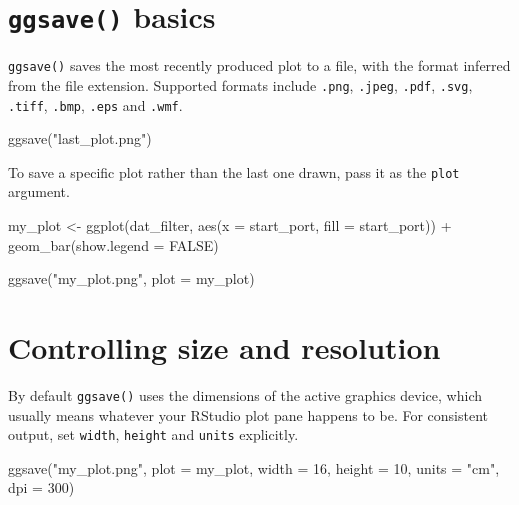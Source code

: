 \documentclass[
  english,
  letterpaper,
]{book}
\newenvironment{Shaded}{\begin{snugshade}}{\end{snugshade}}
\newcommand{\AttributeTok}[1]{\textcolor[rgb]{0.40,0.45,0.13}{#1}}
\newcommand{\ConstantTok}[1]{\textcolor[rgb]{0.56,0.35,0.01}{#1}}
\newcommand{\DecValTok}[1]{\textcolor[rgb]{0.68,0.00,0.00}{#1}}
\newcommand{\FunctionTok}[1]{\textcolor[rgb]{0.28,0.35,0.67}{#1}}
\newcommand{\NormalTok}[1]{\textcolor[rgb]{0.00,0.23,0.31}{#1}}
\newcommand{\OtherTok}[1]{\textcolor[rgb]{0.00,0.23,0.31}{#1}}
\newcommand{\SpecialCharTok}[1]{\textcolor[rgb]{0.37,0.37,0.37}{#1}}
\newcommand{\StringTok}[1]{\textcolor[rgb]{0.13,0.47,0.30}{#1}}
\begin{document}
\section{\texorpdfstring{\texttt{ggsave()}
basics}{ggsave() basics}}\label{ggsave-basics}

\texttt{ggsave()} saves the most recently produced plot to a file, with
the format inferred from the file extension. Supported formats include
\texttt{.png}, \texttt{.jpeg}, \texttt{.pdf}, \texttt{.svg},
\texttt{.tiff}, \texttt{.bmp}, \texttt{.eps} and \texttt{.wmf}.

\begin{Shaded}
\begin{Highlighting}[]
\FunctionTok{ggsave}\NormalTok{(}\StringTok{"last\_plot.png"}\NormalTok{)}
\end{Highlighting}
\end{Shaded}

To save a specific plot rather than the last one drawn, pass it as the
\texttt{plot} argument.

\begin{Shaded}
\begin{Highlighting}[]
\NormalTok{my\_plot }\OtherTok{\textless{}{-}} \FunctionTok{ggplot}\NormalTok{(dat\_filter, }\FunctionTok{aes}\NormalTok{(}\AttributeTok{x =}\NormalTok{ start\_port, }\AttributeTok{fill =}\NormalTok{ start\_port)) }\SpecialCharTok{+}
  \FunctionTok{geom\_bar}\NormalTok{(}\AttributeTok{show.legend =} \ConstantTok{FALSE}\NormalTok{)}

\FunctionTok{ggsave}\NormalTok{(}\StringTok{"my\_plot.png"}\NormalTok{, }\AttributeTok{plot =}\NormalTok{ my\_plot)}
\end{Highlighting}
\end{Shaded}

\section{Controlling size and
resolution}\label{controlling-size-and-resolution}

By default \texttt{ggsave()} uses the dimensions of the active graphics
device, which usually means whatever your RStudio plot pane happens to
be. For consistent output, set \texttt{width}, \texttt{height} and
\texttt{units} explicitly.

\begin{Shaded}
\begin{Highlighting}[]
\FunctionTok{ggsave}\NormalTok{(}\StringTok{"my\_plot.png"}\NormalTok{,}
       \AttributeTok{plot =}\NormalTok{ my\_plot,}
       \AttributeTok{width  =} \DecValTok{16}\NormalTok{,}
       \AttributeTok{height =} \DecValTok{10}\NormalTok{,}
       \AttributeTok{units  =} \StringTok{"cm"}\NormalTok{,}
       \AttributeTok{dpi    =} \DecValTok{300}\NormalTok{)}
\end{Highlighting}
\end{Shaded}
\end{document}
